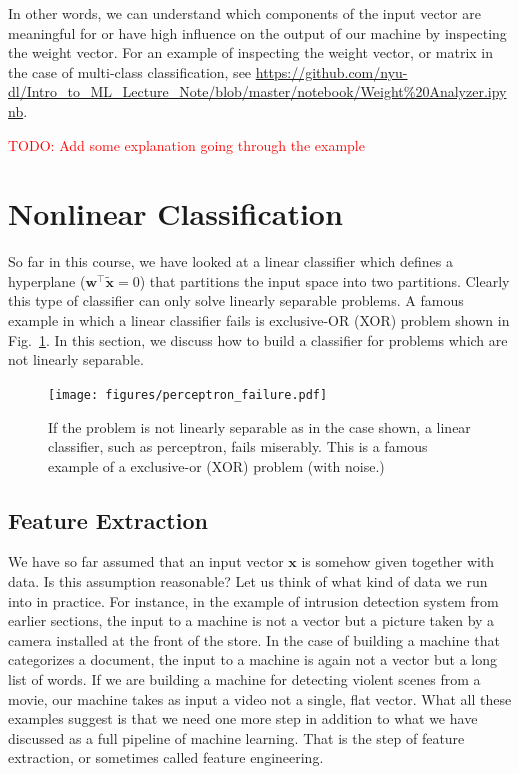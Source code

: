 \documentclass{report}
\newcommand{\vect}[1]{\mathbf{#1}}
\newcommand{\vx}[0]{\vect{x}}
\newcommand{\vw}[0]{\vect{w}}
\newcommand{\alert}[1]{\textcolor{red}{#1}}
\begin{document}
In other words, we can understand which components of the input vector are
meaningful for or have high influence on the output of our machine by inspecting
the weight vector. For an example of inspecting the weight vector, or matrix in
the case of multi-class classification, see
\url{https://github.com/nyu-dl/Intro_to_ML_Lecture_Note/blob/master/notebook/Weight%20Analyzer.ipynb}.

\alert{TODO: Add some explanation going through the example}


\section{Nonlinear Classification}

So far in this course, we have looked at a linear classifier which defines a
hyperplane ($\vw^\top \tilde{\vx} = 0$) that partitions the input space into two
partitions. Clearly this type of classifier can only solve linearly separable
problems. A famous example in which a linear classifier fails is exclusive-OR
(XOR) problem shown in Fig.~\ref{fig:perceptron_xor}. In this section, we
discuss how to build a classifier for problems which are not linearly separable.

\begin{figure}
    \centering
    \begin{minipage}{0.6\textwidth}
        \centering
        \texttt{[image: figures/perceptron\_failure.pdf]}
    \end{minipage}
    \begin{minipage}{0.39\textwidth}
        \caption{
            \label{fig:perceptron_xor}
            If the problem is not linearly separable as in the case shown, a
            linear classifier, such as perceptron, fails miserably. This is a
            famous example of a exclusive-or (XOR) problem (with noise.)
        }
    \end{minipage}
\end{figure}

\subsection{Feature Extraction}

We have so far assumed that an input vector $\vx$ is somehow given together with
data. Is this assumption reasonable? Let us think of what kind of data we run
into in practice. For instance, in the example of intrusion detection system
from earlier sections, the input to a machine is not a vector but a picture
taken by a camera installed at the front of the store. In the case of building a
machine that categorizes a document, the input to a machine is again not a
vector but a long list of words. If we are building a machine for detecting
violent scenes from a movie, our machine takes as input a video not a single,
flat vector. What all these examples suggest is that we need one more step in
addition to what we have discussed as a full pipeline of machine learning. That
is the step of feature extraction, or sometimes called feature engineering.
\end{document}
